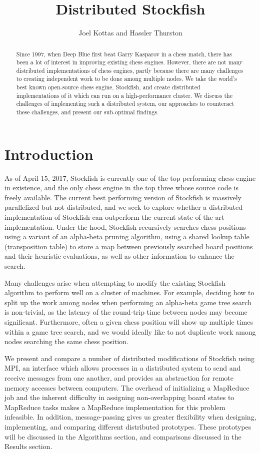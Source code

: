 \documentclass{article}
\title{Distributed Stockfish}
\author{Joel Kottas and Hassler Thurston}
\date{}
\begin{document}
\maketitle

\begin{abstract}
	Since 1997, when Deep Blue first beat Garry Kasparov in a chess match,
	there has been a lot of
	interest in improving existing chess engines. However, there are not
	many distributed implementations of chess engines, partly
	because there are many challenges to creating independent work to be
	done among multiple nodes. We take the world's
	best known open-source chess engine, Stockfish, and create distributed
	implementations of it which can run on a high-performance cluster. We
	discuss the challenges of implementing such a distributed system, our
	approaches to counteract these challenges, and present our sub-optimal findings.
\end{abstract}

\section{Introduction}
As of April 15, 2017, Stockfish\cite{Stockfish} is currently one of the top performing
chess engine in existence, and the only chess engine in the top three whose
source code is freely available\cite{ChessStandings}. The current best
performing version of Stockfish is massively parallelized but not distributed,
and we seek to explore whether a distributed implementation of Stockfish can
outperform the current state-of-the-art implementation. Under the hood,
Stockfish recursively searches chess positions using a variant of an alpha-beta
pruning algorithm, using a shared lookup table (transposition table) to
store a map between previously searched board positions and their heuristic
evaluations, as well as other information to enhance the search.

Many challenges arise when attempting to modify the
existing Stockfish algorithm to perform well on a cluster of machines.
For example, deciding how to split up the work among nodes when performing an alpha-beta game
tree search is non-trivial, as the latency of the round-trip time between nodes
may become significant. Furthermore, often a given chess position will show up
multiple times within a game tree search, and we would ideally like to not
duplicate work among nodes searching the same chess position.

We present and compare a number of distributed modifications of Stockfish
using MPI\cite{MPI}, an interface which allows processes in a distributed system to
send and receive messages from one another, and provides an abstraction for remote memory accesses
between computers. The overhead of initializing a MapReduce job and the
inherent difficulty in assigning non-overlapping board states to MapReduce tasks
makes a MapReduce implementation for this problem infeasible. In addition,
message-passing gives us greater flexibility when designing, implementing, and
comparing different distributed prototypes. These prototypes will be discussed in
the Algorithms section, and comparisons discussed in the Results section.
\end{document}
